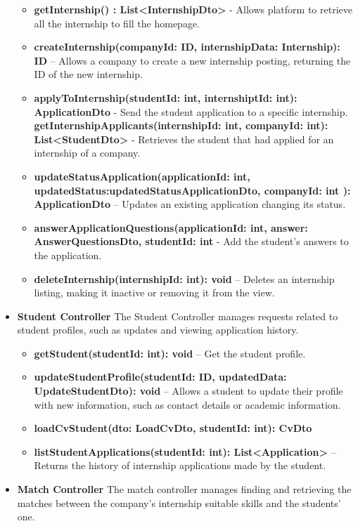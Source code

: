 \begin{itemize}
\begin{itemize}
\item \textbf{getInternship() : List<InternshipDto> } - Allows platform to retrieve all the internship to fill the homepage.
    \item \textbf{createInternship(companyId: ID, internshipData: Internship): ID} – Allows a company to create a new internship posting, returning the ID of the new internship.
    \item \textbf{applyToInternship(studentId: int, internshiptId: int): ApplicationDto} - Send the student application to a specific internship.
    \iterm \textbf{getInternshipApplicants(internshipId: int, companyId: int): List<StudentDto>} - Retrieves the student that had applied for an internship of a company.
    \item \textbf{updateStatusApplication(applicationId: int, updatedStatus:updatedStatusApplicationDto, companyId: int  ): ApplicationDto} – Updates an existing application changing its status.
    \item \textbf{answerApplicationQuestions(applicationId: int, answer: AnswerQuestionsDto, studentId: int} - Add the student's answers to the application.
    \item \textbf{deleteInternship(internshipId: int): void} – Deletes an internship listing, making it inactive or removing it from the view.
\end{itemize}



\item \textbf{Student Controller}
The Student Controller manages requests related to student profiles, such as updates and viewing application history.

\begin{itemize}
    \item \textbf{getStudent(studentId: int): void} – Get the student profile.
    \item \textbf{updateStudentProfile(studentId: ID, updatedData: UpdateStudentDto): void} – Allows a student to update their profile with new information, such as contact details or academic information.
    \item \textbf{loadCvStudent(dto: LoadCvDto, studentId: int): CvDto}
    \item \textbf{listStudentApplications(studentId: int): List<Application>} – Returns the history of internship applications made by the student.
\end{itemize}

\item \textbf{Match Controller}
The match controller manages finding and retrieving the matches between the company's internship suitable skills and the students' one.
\begin{itemize}


\end{itemize}
\end{itemize}
